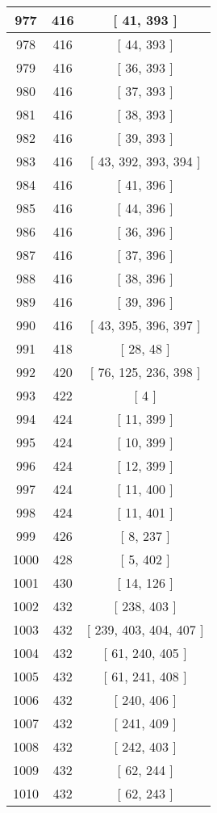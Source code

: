 \begin{center}
\begin{longtable}[H]{|| c c c ||}
977 & 416 & [ 41, 393 ] \\ 
\hline
978 & 416 & [ 44, 393 ] \\ 
\hline
979 & 416 & [ 36, 393 ] \\ 
\hline
980 & 416 & [ 37, 393 ] \\ 
\hline
981 & 416 & [ 38, 393 ] \\ 
\hline
982 & 416 & [ 39, 393 ] \\ 
\hline
983 & 416 & [ 43, 392, 393, 394 ] \\ 
\hline
984 & 416 & [ 41, 396 ] \\ 
\hline
985 & 416 & [ 44, 396 ] \\ 
\hline
986 & 416 & [ 36, 396 ] \\ 
\hline
987 & 416 & [ 37, 396 ] \\ 
\hline
988 & 416 & [ 38, 396 ] \\ 
\hline
989 & 416 & [ 39, 396 ] \\ 
\hline
990 & 416 & [ 43, 395, 396, 397 ] \\ 
\hline
991 & 418 & [ 28, 48 ] \\ 
\hline
992 & 420 & [ 76, 125, 236, 398 ] \\ 
\hline
993 & 422 & [ 4 ] \\ 
\hline
994 & 424 & [ 11, 399 ] \\ 
\hline
995 & 424 & [ 10, 399 ] \\ 
\hline
996 & 424 & [ 12, 399 ] \\ 
\hline
997 & 424 & [ 11, 400 ] \\ 
\hline
998 & 424 & [ 11, 401 ] \\ 
\hline
999 & 426 & [ 8, 237 ] \\ 
\hline
1000 & 428 & [ 5, 402 ] \\ 
\hline
1001 & 430 & [ 14, 126 ] \\ 
\hline
1002 & 432 & [ 238, 403 ] \\ 
\hline
1003 & 432 & [ 239, 403, 404, 407 ] \\ 
\hline
1004 & 432 & [ 61, 240, 405 ] \\ 
\hline
1005 & 432 & [ 61, 241, 408 ] \\ 
\hline
1006 & 432 & [ 240, 406 ] \\ 
\hline
1007 & 432 & [ 241, 409 ] \\ 
\hline
1008 & 432 & [ 242, 403 ] \\ 
\hline
1009 & 432 & [ 62, 244 ] \\ 
\hline
1010 & 432 & [ 62, 243 ] \\ 

\end{longtable}
\end{center}

